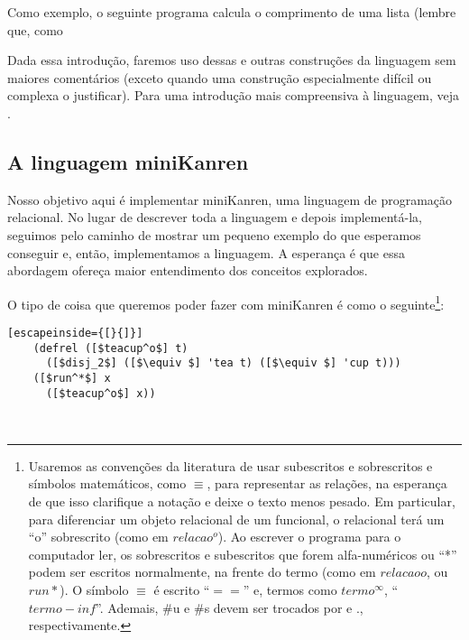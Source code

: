 \documentclass{article}
\begin{document}
  Como exemplo, o seguinte programa calcula o comprimento de uma lista
  (lembre que, como 

  Dada essa introdução, faremos uso dessas e outras construções da
  linguagem sem maiores comentários (exceto quando uma construção
  especialmente difícil ou complexa o justificar). Para uma introdução
  mais compreensiva à linguagem, veja \cite{kent}.

  \subsection{A linguagem miniKanren}

  Nosso objetivo aqui é implementar miniKanren, uma linguagem de
  programação relacional. No lugar de descrever toda a linguagem e
  depois implementá-la, seguimos pelo caminho de mostrar um pequeno
  exemplo do que esperamos conseguir e, então, implementamos a
  linguagem. A esperança é que essa abordagem ofereça maior
  entendimento dos conceitos explorados.

  O tipo de coisa que queremos poder fazer com miniKanren é como o
  seguinte\footnote{Usaremos as convenções da literatura de usar
    subescritos e sobrescritos e símbolos matemáticos, como $\equiv $, para
    representar as relações, na esperança de que isso clarifique a
    notação e deixe o texto menos pesado. Em particular, para
    diferenciar um objeto relacional de um funcional, o relacional
    terá um ``o'' sobrescrito (como em $relacao^o$). Ao escrever o
    programa para o computador ler, os sobrescritos e subescritos que
    forem alfa-numéricos ou ``*'' podem ser escritos normalmente, na
    frente do termo (como em $relacaoo$, ou $run*$). O símbolo $\equiv$ é
    escrito ``$==$'' e, termos como $termo^\infty$,
    ``$termo-inf$''. Ademais, \#u e \#s devem ser trocados por
     e ., respectivamente.}:
  \\

  \begin{lstlisting}[escapeinside={[}{]}]
    (defrel ([$teacup^o$] t)
      ([$disj_2$] ([$\equiv $] 'tea t) ([$\equiv $] 'cup t)))
    ([$run^*$] x
      ([$teacup^o$] x))
  \end{lstlisting}
  \hspace{1cm} \seta\ \\


\end{document}

